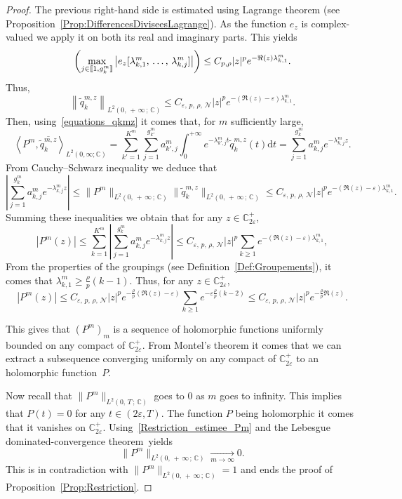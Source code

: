 \documentclass[AHL,Unicode,longabstracts]{cedram}
\newcommand{\llbracket}{\mathopen{[\mkern -2.7mu[}}
\newcommand{\rrbracket}{\mathclose{]\mkern -2.7mu]}}
\newcommand{\inter}[2]{\llbracket #1,#2 \rrbracket}
\newcommand{\n}{g}
\newcommand{\NN}{\mathcal{N}}
\newcommand{\C}{\mathbb{C}}
\newcommand{\Cpeps}{\mathbb{C}^+_{2\varepsilon}}
\newcommand{\md}{\mathrm{d}}
\begin{document}
\begin{proof}
The previous right-hand side is estimated using Lagrange theorem (see Proposition~\ref{Prop:DifferencesDiviseesLagrange}). As the function $e_z$ is complex-valued we apply it on both its real and imaginary parts. This yields
\[
\left(\max_{j\in \inter{1}{\n^m_k}} \left| e_z[\lambda^m_{k,1},\,\dotsc,\,\lambda^m_{k,j}] \right| \right) \leq C_{p,\rho} |z|^p e^{-\Re(z) \lambda^m_{k,1}}.
\]
Thus,
\[
\left\| \widetilde{q}_k^{m,z}\right\|_{L^2(0,\,+\,\infty\,;\,\C)} \leq C_{\varepsilon,\,p,\,\rho,\,\NN} |z|^p e^{-(\Re(z)-\varepsilon) \lambda^m_{k,1}}.
\]
Then, using~\eqref{equations_qkmz} it comes that, for $m$ sufficiently large,
\[
\left\langle P^m, \overline{\widetilde{q}_k^{m,z}} \right\rangle_{L^2(0,\infty; \C)} = \sum_{k'=1}^{K^m} \sum_{j=1}^{\n_{k'}^m} a_{k',j}^m \int_0^{+\infty} e^{-\lambda^m_{k',j} t} \widetilde{q}_k^{m,z}(t) \md t = \sum_{j=1}^{\n_k^m} a_{k,j}^m e^{-\lambda_{k,j}^m z}.
\]
From Cauchy--Schwarz inequality we deduce that
\[
\left| \sum_{j=1}^{\n_k^m} a_{k,j}^m e^{-\lambda_{k,j}^m z} \right| \leq \| P^m \|_{L^2(0,\,+\,\infty\,;\,\C)} \| \widetilde{q}_k^{m,z} \|_{L^2(0,\,+\,\infty\,;\,\C)} \leq C_{\varepsilon,\,p,\,\rho,\,\NN} |z|^p e^{-(\Re(z)-\varepsilon) \lambda^m_{k,1}}.
\]
Summing these inequalities we obtain that for any $z \in \Cpeps$,
\[
|P^m(z)| \leq \sum_{k=1}^{K^m} \left| \sum_{j=1}^{\n_k^m} a_{k,j}^m e^{-\lambda_{k,j}^m z} \right|
\leq C_{\varepsilon,\,p,\,\rho,\,\NN} |z|^p \sum_{k\geq 1} e^{-(\Re(z)-\varepsilon) \lambda^m_{k,1}},
\]
From the properties of the groupings (see Definition~\ref{Def:Groupements}), it comes that $\lambda^m_{k,1} \geq \frac{\rho}{p} (k-1)$. Thus, for any $z \in \Cpeps$,
\begin{equation}\label{Restriction_estimee_Pm}
|P^m(z)|
\leq C_{\varepsilon,\,p,\,\rho,\,\NN} |z|^p e^{-\frac{\rho}{p} (\Re(z)-\varepsilon)} \sum_{k\geq 1} e^{-\varepsilon \frac{\rho}{p} (k-2)}
\leq C_{\varepsilon,\,p,\,\rho,\,\NN} |z|^p e^{-\frac{\rho}{p} \Re(z)}.
\end{equation}

This gives that $(P^m)_m$ is a sequence of holomorphic functions uniformly bounded on any compact of $\Cpeps$. From Montel's theorem it comes that we can extract a subsequence converging uniformly on any compact of $\Cpeps$ to an holomorphic function~$P$.

Now recall that $\|P^m\|_{L^2(0,\,T\,;\,\C)}$ goes to $0$ as $m$ goes to infinity. This implies that $P(t)=0$ for any $t \in (2 \varepsilon, T)$. The function $P$ being holomorphic it comes that it vanishes on $\Cpeps$. Using~\eqref{Restriction_estimee_Pm} and the Lebesgue dominated-convergence theorem~yields
\[
\|P^m\|_{L^2(0,\,+\,\infty\,;\,\C)} \xrightarrow[m\to \infty]{} 0.
\]
This is in contradiction with $\| P^m \|_{L^2(0,\,+\,\infty\,;\,\C)} =1$ and ends the proof of Proposition~\ref{Prop:Restriction}.
\end{proof}
\end{document}
